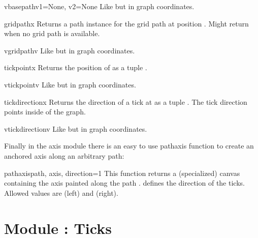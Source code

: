 \begin{methoddesc}[anchoredaxis]{vbasepath}{v1=None, v2=None}
  Like  but in graph coordinates.
\end{methoddesc}

\begin{methoddesc}[anchoredaxis]{gridpath}{x}
  Returns a path instance for the grid path at position .
  Might return  when no grid path is available.
\end{methoddesc}

\begin{methoddesc}[anchoredaxis]{vgridpath}{v}
  Like  but in graph coordinates.
\end{methoddesc}

\begin{methoddesc}[anchoredaxis]{tickpoint}{x}
  Returns the position of  as a tuple .
\end{methoddesc}

\begin{methoddesc}[anchoredaxis]{vtickpoint}{v}
  Like  but in graph coordinates.
\end{methoddesc}

\begin{methoddesc}[anchoredaxis]{tickdirection}{x}
  Returns the direction of a tick at  as a tuple .
  The tick direction points inside of the graph.
\end{methoddesc}

\begin{methoddesc}[anchoredaxis]{vtickdirection}{v}
  Like  but in graph coordinates.
\end{methoddesc}

Finally in the axis module there is an easy to use pathaxis function
to create an anchored axis along an arbitrary path:

\begin{funcdesc}{pathaxis}{path, axis, direction=1}
  This function returns a (specialized) canvas containing the axis
   painted along the path . 
  defines the direction of the ticks. Allowed values are 
  (left) and  (right).
\end{funcdesc} %

\section{Module : Ticks} %

